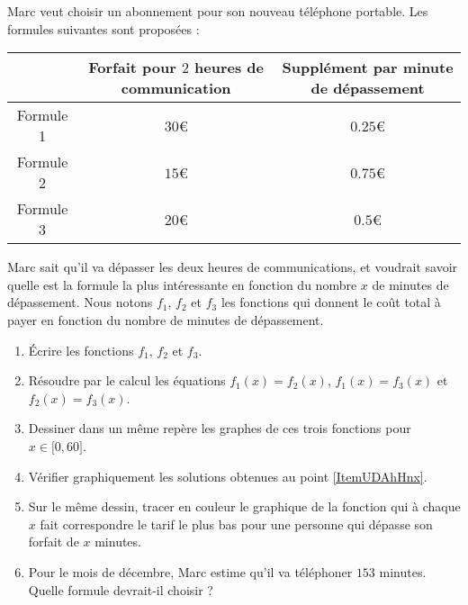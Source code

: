 
\begin{exercice}\label{exosmath-0134}

    Marc veut choisir un abonnement pour son nouveau téléphone portable. Les formules suivantes sont proposées :
    \begin{center}
    \begin{tabular}[]{|c||c|c|}
        \hline
        &Forfait pour \( 2\) heures de communication& Supplément par minute de dépassement\\
        \hline\hline
        Formule 1&\( 30\)€&\( 0.25\)€\\
        \hline
        Formule 2&\( 15\)€&\( 0.75\)€\\
        \hline
        Formule 3&\( 20\)€&\( 0.5\)€\\
        \hline
    \end{tabular}
    \end{center}

    Marc sait qu'il va dépasser les deux heures de communications, et voudrait savoir quelle est la formule la plus intéressante en fonction du nombre \( x\) de minutes de dépassement. Nous notons \( f_1\), \( f_2\) et \( f_3\) les fonctions qui donnent le coût total à payer en fonction du nombre de minutes de dépassement.
    \begin{enumerate}
        \item
            Écrire les fonctions \( f_1\), \( f_2\) et \( f_3\).
        \item   \label{ItemUDAhHnx}
            Résoudre par le calcul les équations \( f_1(x)=f_2(x)\), \( f_1(x)=f_3(x)\) et \( f_2(x)=f_3(x)\).
        \item
            Dessiner dans un même repère les graphes de ces trois fonctions pour \( x\in \mathopen[ 0 , 60 \mathclose]\). 
        \item
            Vérifier graphiquement les solutions obtenues au point \ref{ItemUDAhHnx}.
        \item
            Sur le même dessin, tracer en couleur le graphique de la fonction qui à chaque \( x\) fait correspondre le tarif le plus bas pour une personne qui dépasse son forfait de \( x\) minutes.
        \item
            Pour le mois de décembre, Marc estime qu'il va téléphoner \( 153\) minutes. Quelle formule devrait-il choisir ?
    \end{enumerate}

\end{exercice}
